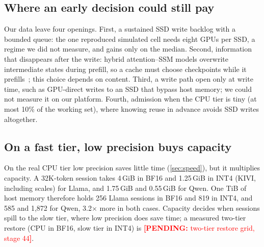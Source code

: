 \documentclass[conference]{IEEEtran}
\newcommand{\pending}[1]{\textcolor{red}{\textbf{[PENDING:} #1\textbf{]}}}
\begin{document}
\subsection{Where an early decision could still pay}
Our data leave four openings.
First, a sustained SSD write backlog with a bounded queue: the one reproduced simulated cell needs eight GPUs per SSD, a regime we did not measure, and gains only on the median.
Second, information that disappears after the write: hybrid attention--SSM models overwrite intermediate states during prefill, so a cache must choose checkpoints while it prefills~\cite{marconi2025}; this choice depends on content.
Third, a write path open only at write time, such as GPU-direct writes to an SSD that bypass host memory; we could not measure it on our platform.
Fourth, admission when the CPU tier is tiny (at most 10\% of the working set), where knowing reuse in advance avoids SSD writes altogether.

\subsection{On a fast tier, low precision buys capacity}
On the real CPU tier low precision saves little time (\cref{sec:speed}), but it multiplies capacity.
A 32K-token session takes 4\,GiB in BF16 and 1.25\,GiB in INT4 (KIVI, including scales) for Llama, and 1.75\,GiB and 0.55\,GiB for Qwen.
One TiB of host memory therefore holds 256 Llama sessions in BF16 and 819 in INT4, and 585 and 1,872 for Qwen, 3.2$\times$ more in both cases.
Capacity decides when sessions spill to the slow tier, where low precision does save time; a measured two-tier restore (CPU in BF16, slow tier in INT4) is \pending{two-tier restore grid, stage 44}.
\end{document}
